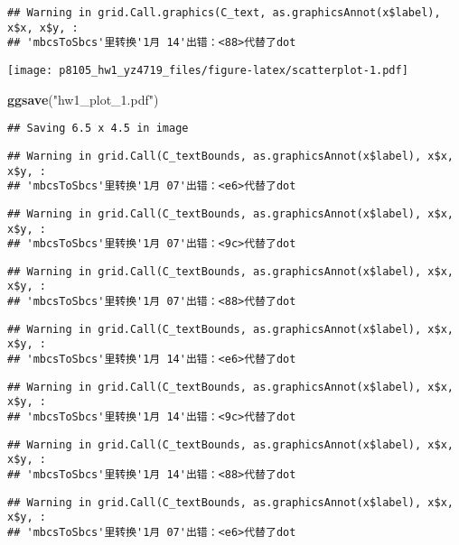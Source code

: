 \documentclass[
]{article}
\newenvironment{Shaded}{\begin{snugshade}}{\end{snugshade}}
\newcommand{\FunctionTok}[1]{\textcolor[rgb]{0.13,0.29,0.53}{\textbf{#1}}}
\newcommand{\NormalTok}[1]{#1}
\newcommand{\StringTok}[1]{\textcolor[rgb]{0.31,0.60,0.02}{#1}}
\begin{document}
\begin{verbatim}
## Warning in grid.Call.graphics(C_text, as.graphicsAnnot(x$label), x$x, x$y, :
## 'mbcsToSbcs'里转换'1月 14'出错：<88>代替了dot
\end{verbatim}

\texttt{[image: p8105\_hw1\_yz4719\_files/figure-latex/scatterplot-1.pdf]}

\begin{Shaded}
\begin{Highlighting}[]
\FunctionTok{ggsave}\NormalTok{(}\StringTok{"hw1\_plot\_1.pdf"}\NormalTok{)}
\end{Highlighting}
\end{Shaded}

\begin{verbatim}
## Saving 6.5 x 4.5 in image
\end{verbatim}

\begin{verbatim}
## Warning in grid.Call(C_textBounds, as.graphicsAnnot(x$label), x$x, x$y, :
## 'mbcsToSbcs'里转换'1月 07'出错：<e6>代替了dot
\end{verbatim}

\begin{verbatim}
## Warning in grid.Call(C_textBounds, as.graphicsAnnot(x$label), x$x, x$y, :
## 'mbcsToSbcs'里转换'1月 07'出错：<9c>代替了dot
\end{verbatim}

\begin{verbatim}
## Warning in grid.Call(C_textBounds, as.graphicsAnnot(x$label), x$x, x$y, :
## 'mbcsToSbcs'里转换'1月 07'出错：<88>代替了dot
\end{verbatim}

\begin{verbatim}
## Warning in grid.Call(C_textBounds, as.graphicsAnnot(x$label), x$x, x$y, :
## 'mbcsToSbcs'里转换'1月 14'出错：<e6>代替了dot
\end{verbatim}

\begin{verbatim}
## Warning in grid.Call(C_textBounds, as.graphicsAnnot(x$label), x$x, x$y, :
## 'mbcsToSbcs'里转换'1月 14'出错：<9c>代替了dot
\end{verbatim}

\begin{verbatim}
## Warning in grid.Call(C_textBounds, as.graphicsAnnot(x$label), x$x, x$y, :
## 'mbcsToSbcs'里转换'1月 14'出错：<88>代替了dot
\end{verbatim}

\begin{verbatim}
## Warning in grid.Call(C_textBounds, as.graphicsAnnot(x$label), x$x, x$y, :
## 'mbcsToSbcs'里转换'1月 07'出错：<e6>代替了dot
\end{verbatim}
\end{document}

